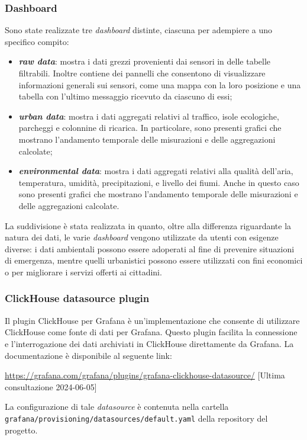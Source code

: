 \subsubsection{Dashboard}
Sono state realizzate tre \textit{dashboard} distinte, ciascuna per adempiere a uno specifico compito:
\begin{itemize}
	\item \textbf{\textit{raw data}}: mostra i dati grezzi provenienti dai sensori in delle tabelle filtrabili. Inoltre contiene dei pannelli che consentono
	      di visualizzare informazioni generali sui sensori, come una mappa con la loro posizione e una tabella con l'ultimo messaggio ricevuto da ciascuno di essi;
	\item \textbf{\textit{urban data}}: mostra i dati aggregati relativi al traffico, isole ecologiche, parcheggi e colonnine di ricarica. In particolare, sono presenti
	      grafici che mostrano l'andamento temporale delle misurazioni e delle aggregazioni calcolate;
	\item \textbf{\textit{environmental data}}: mostra i dati aggregati relativi alla qualità dell'aria, temperatura, umidità, precipitazioni, e livello dei fiumi.
	      Anche in questo caso sono presenti grafici che mostrano l'andamento temporale delle misurazioni e delle aggregazioni calcolate.
\end{itemize}
La suddivisione è stata realizzata in quanto, oltre alla differenza riguardante la natura dei dati, le varie \textit{dashboard} vengono utilizzate da utenti con esigenze diverse:
i dati ambientali possono essere adoperati al fine di prevenire situazioni di emergenza, mentre quelli urbanistici possono essere utilizzati con fini economici
o per migliorare i servizi offerti ai cittadini.

\subsubsection{ClickHouse datasource plugin}
Il plugin ClickHouse per Grafana è un'implementazione che consente di utilizzare ClickHouse come fonte di dati per Grafana. Questo plugin facilita la connessione e l'interrogazione dei dati archiviati in ClickHouse direttamente da Grafana.
La documentazione è disponibile al seguente link:
\begin{center}
	\url{https://grafana.com/grafana/plugins/grafana-clickhouse-datasource/} [Ultima consultazione 2024-06-05]
\end{center}

La configurazione di tale \textit{datasource} è contenuta nella cartella \\
\texttt{grafana/provisioning/datasources/default.yaml} della repository del progetto.

